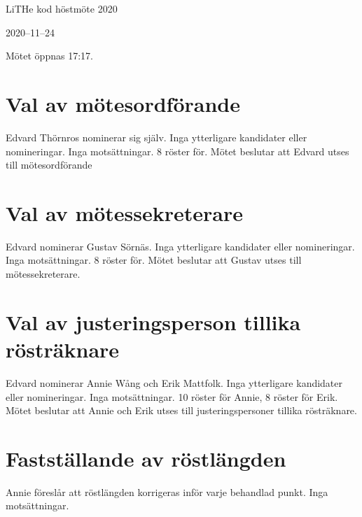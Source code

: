 \documentclass[a4paper]{article}
\begin{document}
\begin{center}
{\huge LiTHe kod höstmöte 2020}\par
\vspace{0.5em}
{\Large 2020--11--24}
\vspace{1.5em}
\end{center}

Mötet öppnas 17:17.

\hypertarget{val-av-muxf6tesordfuxf6rande}{%
\section{Val av mötesordförande}\label{val-av-muxf6tesordfuxf6rande}}

Edvard Thörnros nominerar sig själv. Inga ytterligare kandidater eller
nomineringar. Inga motsättningar. 8 röster för. Mötet beslutar att
Edvard utses till mötesordförande

\hypertarget{val-av-muxf6tessekreterare}{%
\section{Val av mötessekreterare}\label{val-av-muxf6tessekreterare}}

Edvard nominerar Gustav Sörnäs. Inga ytterligare kandidater eller
nomineringar. Inga motsättningar. 8 röster för. Mötet beslutar att
Gustav utses till mötessekreterare.

\hypertarget{val-av-justeringsperson-tillika-ruxf6struxe4knare}{%
\section{Val av justeringsperson tillika
rösträknare}\label{val-av-justeringsperson-tillika-ruxf6struxe4knare}}

Edvard nominerar Annie Wång och Erik Mattfolk. Inga ytterligare kandidater eller
nomineringar. Inga motsättningar. 10 röster för Annie, 8 röster för Erik. Mötet
beslutar att Annie och Erik utses till justeringspersoner tillika rösträknare.

\hypertarget{faststuxe4llande-av-ruxf6stluxe4ngden}{%
\section{Fastställande av
röstlängden}\label{faststuxe4llande-av-ruxf6stluxe4ngden}}

Annie föreslår att röstlängden korrigeras inför varje behandlad punkt.
Inga motsättningar.
\end{document}
